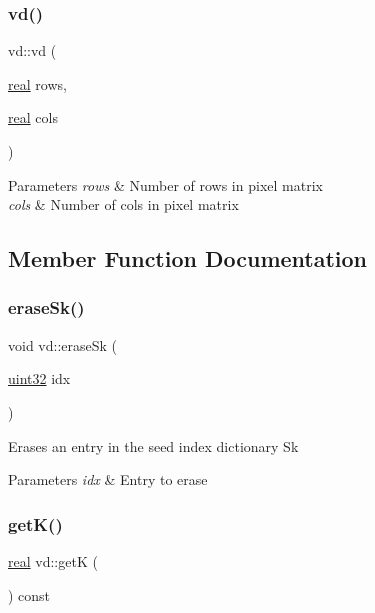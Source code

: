 \subsubsection{\texorpdfstring{vd()}{vd()}}
{\footnotesize\ttfamily vd\+::vd (\begin{DoxyParamCaption}\item[{\mbox{\hyperlink{typedefs_8cpp_a58a0c7cf2501f4492da833421be92547}{real}}}]{rows,  }\item[{\mbox{\hyperlink{typedefs_8cpp_a58a0c7cf2501f4492da833421be92547}{real}}}]{cols }\end{DoxyParamCaption})}


\begin{DoxyParams}{Parameters}
{\em rows} & Number of rows in pixel matrix \\
\hline
{\em cols} & Number of cols in pixel matrix \\
\hline
\end{DoxyParams}


\subsection{Member Function Documentation}
\mbox{\label{classvd_ab5a972992406d5c42d1398573d9c769a}} 
\subsubsection{\texorpdfstring{erase\+Sk()}{eraseSk()}}
{\footnotesize\ttfamily void vd\+::erase\+Sk (\begin{DoxyParamCaption}\item[{\mbox{\hyperlink{typedefs_8cpp_a8ad23e2333787a214e20a58a284a5a60}{uint32}}}]{idx }\end{DoxyParamCaption})}

Erases an entry in the seed index dictionary Sk 
\begin{DoxyParams}{Parameters}
{\em idx} & Entry to erase \\
\hline
\end{DoxyParams}
\mbox{\label{classvd_a624f53ae4a7012f267111359e9245f81}} 
\subsubsection{\texorpdfstring{get\+K()}{getK()}}
{\footnotesize\ttfamily \mbox{\hyperlink{typedefs_8cpp_a58a0c7cf2501f4492da833421be92547}{real}} vd\+::getK (\begin{DoxyParamCaption}{ }\end{DoxyParamCaption}) const}

